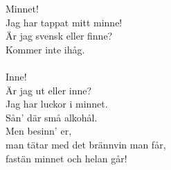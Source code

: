 
Minnet! \\ Jag har tappat mitt minne! \\ Är jag svensk eller finne? \\ Kommer inte ihåg. \\ \hspace{10mm} \\ Inne! \\ Är jag ut eller inne? \\ Jag har luckor i minnet. \\ Sån' där små alkohål. \\ Men besinn' er, \\ man tätar med det brännvin man får, \\ fastän minnet och helan går!